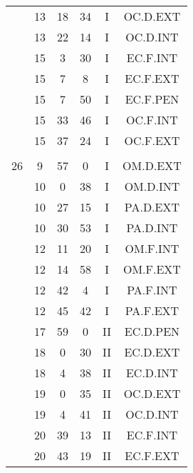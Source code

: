 \documentclass[12pt, a4paper]{article}
\begin{document}
\begin{multicols}{3}
{\begin{tabular}{c c c c c c}
	 	 	 	 & 13 & 18 & 34 & I & OC.D.EXT\\%
	 	 	 	 & 13 & 22 & 14 & I & OC.D.INT\\%
	 	 	 	 & 15 & 3 & 30 & I & EC.F.INT\\%
	 	 	 	 & 15 & 7 & 8 & I & EC.F.EXT\\%
	 	 	 	 & 15 & 7 & 50 & I & EC.F.PEN\\%
	 	 	 	 & 15 & 33 & 46 & I & OC.F.INT\\%
	 	 	 	 & 15 & 37 & 24 & I & OC.F.EXT\\%
	 	 	 	 & & & & & \\%
	 	 	 	26 & 9 & 57 & 0 & I & OM.D.EXT\\%
	 	 	 	 & 10 & 0 & 38 & I & OM.D.INT\\%
	 	 	 	 & 10 & 27 & 15 & I & PA.D.EXT\\%
	 	 	 	 & 10 & 30 & 53 & I & PA.D.INT\\%
	 	 	 	 & 12 & 11 & 20 & I & OM.F.INT\\%
	 	 	 	 & 12 & 14 & 58 & I & OM.F.EXT\\%
	 	 	 	 & 12 & 42 & 4 & I & PA.F.INT\\%
	 	 	 	 & 12 & 45 & 42 & I & PA.F.EXT\\%
	 	 	 	 & 17 & 59 & 0 & II & EC.D.PEN\\%
	 	 	 	 & 18 & 0 & 30 & II & EC.D.EXT\\%
	 	 	 	 & 18 & 4 & 38 & II & EC.D.INT\\%
	 	 	 	 & 19 & 0 & 35 & II & OC.D.EXT\\%
	 	 	 	 & 19 & 4 & 41 & II & OC.D.INT\\%
	 	 	 	 & 20 & 39 & 13 & II & EC.F.INT\\%
	 	 	 	 & 20 & 43 & 19 & II & EC.F.EXT\\%

\end{tabular}}
\end{multicols}
\end{document}
